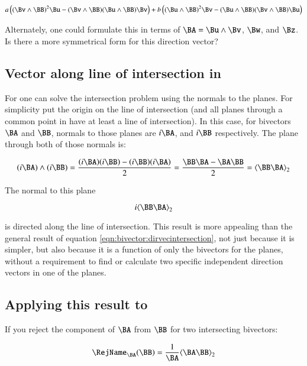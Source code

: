\begin{equation}\label{eqn:bivector:dirvecintersection}
a\left( (\Bv \wedge \BB)^2 \Bu
- (\Bv \wedge \BB)(\Bu \wedge \BB)\Bv \right)
+ b\left((\Bu \wedge \BB)^2 \Bv 
- (\Bu \wedge \BB)(\Bv \wedge \BB)\Bu\right)
\end{equation}

Alternately, one could formulate this in terms of $\BA = \Bu \wedge \Bv$, $\Bw$, and $\Bz$.  Is there a more symmetrical form for this direction vector?

\subsection{Vector along line of intersection in }

For  one can solve the intersection problem using the normals to the planes.  For simplicity put the origin on the line of intersection (and all planes through a common point in  have at least a line of intersection).  In this case, for bivectors $\BA$ and $\BB$, normals to those planes are $i\BA$, and $i\BB$ respectively.  The plane through both of those normals is:

\begin{align*}
(i\BA) \wedge (i\BB)
= \frac{(i\BA)(i\BB) - (i\BB)(i\BA)}{2} 
= \frac{\BB\BA - \BA\BB}{2} 
= \gpgradetwo{\BB\BA}
\end{align*}

The normal to this plane

\begin{equation}\label{eqn:bivector:r3planeintersect}
i\gpgradetwo{\BB\BA}
\end{equation}

is directed along the line of intersection.  This result is more appealing than the general  result of equation \ref{eqn:bivector:dirvecintersection}, not just because it is simpler, but also because it is a function of only the bivectors for the planes, without a requirement to find or calculate two specific independent direction vectors in one of the planes.

\subsection{Applying this result to  }

If you reject the component of $\BA$ from $\BB$ for two intersecting bivectors:

\begin{align*}
\RejName_{\BA}(\BB) = \frac{1}{\BA}\gpgradetwo{\BA\BB}
\end{align*}


